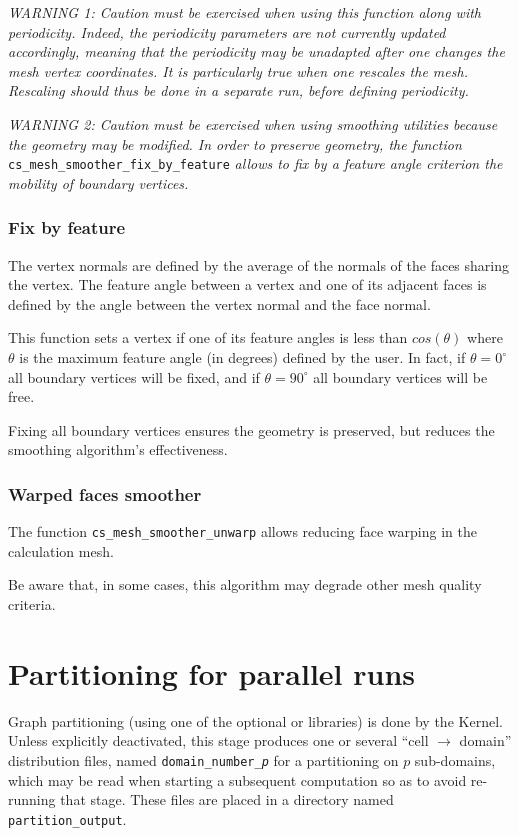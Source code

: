 {{{{\em WARNING 1: Caution must be exercised when using this function
along with periodicity. Indeed, the periodicity parameters are not
currently updated accordingly, meaning that the periodicity may be
unadapted after one changes the mesh vertex coordinates. It is particularly
true when one rescales the mesh. Rescaling should thus be done
in a separate run, before defining periodicity.}

{\em WARNING 2: Caution must be exercised when using smoothing utilities
because the geometry may be modified. In order to preserve geometry,
the function} \texttt{cs\_mesh\_smoother\_fix\_by\_feature} {\em allows to
fix by a feature angle criterion the mobility of boundary vertices.}

\subsubsection{Fix by feature}
The vertex normals are defined by the average of the normals of the
faces sharing the vertex.
The feature angle between a vertex and one of its adjacent faces is defined
by the angle between the vertex normal and the face normal.

This function sets a vertex if one of its feature angles is less than
$cos(\theta)$ where $\theta$ is the maximum feature angle (in degrees)
defined by the user.
In fact, if $\theta = 0^{\circ}$ all boundary vertices will be fixed, and
if $\theta = 90^{\circ}$ all boundary vertices will be free.

Fixing all boundary vertices ensures the geometry is preserved, but reduces
the smoothing algorithm's effectiveness.

\subsubsection{Warped faces smoother}

The function \texttt{cs\_mesh\_smoother\_unwarp} allows reducing face warping
in the calculation mesh.

Be aware that, in some cases, this algorithm may degrade other mesh quality
criteria.

\section{Partitioning for parallel runs\label{sec:parall:part}}

Graph partitioning (using one of the optional \metis or
\scotch libraries) is done by the Kernel. Unless explicitly
deactivated, this stage produces one or several ``cell $\rightarrow$ domain''
distribution files, named {\tt domain\_number\_\it{p}} for a partitioning on
$p$ sub-domains, which may be read when starting a subsequent computation so as
to avoid re-running that stage. These files are placed in a directory named
{\tt partition\_output}.

}}}

